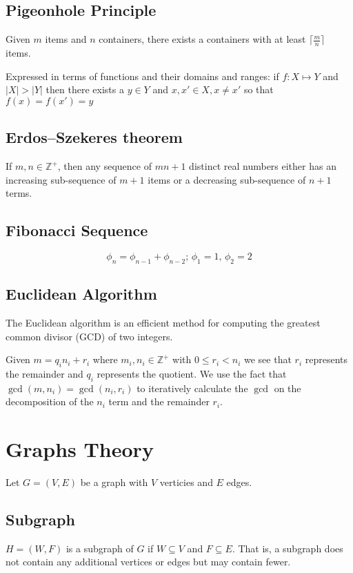 \documentclass{article}
\begin{document}
\subsection{Pigeonhole Principle}
Given $m$ items and $n$ containers, there exists a containers with at least $\lceil \frac{m}{n} \rceil$ items.

Expressed in terms of functions and their domains and ranges: if $f: X \mapsto Y$ and $|X| > |Y|$ then there exists a $y \in Y$ and $x, x' \in X, x \neq x'$ so that $f(x) = f(x') = y$

\subsection{Erdos–Szekeres theorem}
If $m,n \in \mathbb Z^+$, then any sequence of $mn+1$ distinct real numbers either has an increasing sub-sequence of $m+1$ items or a decreasing sub-sequence of $n+1$ terms. 

\subsection{Fibonacci Sequence}
\[
\phi_n = \phi_{n-1} +\phi_{n-2}\text{; } \phi_1 = 1 \text{, } \phi_2 = 2
\]

\subsection{Euclidean Algorithm}
The Euclidean algorithm is an efficient method for computing the greatest common divisor (GCD) of two integers.

Given $m = q_i n_i + r_i$ where $m_i,n_i \in \mathbb Z^+$ with $0 \leq r_i < n_i$ we see that $r_i$ represents the remainder and $q_i$ represents the quotient. We use the fact that $\gcd(m, n_i) = \gcd(n_i, r_i)$ to iteratively calculate the $\gcd$ on the decomposition of the $n_i$ term and the remainder $r_i$.


\section{Graphs Theory}
Let $G = (V, E)$ be a graph with $V$ verticies and $E$ edges. 

\subsection{Subgraph}
$H = (W, F)$ is a subgraph of $G$ if $W \subseteq V$ and $F \subseteq E$. That is, a subgraph does not contain any additional vertices or edges but may contain fewer.
\end{document}

